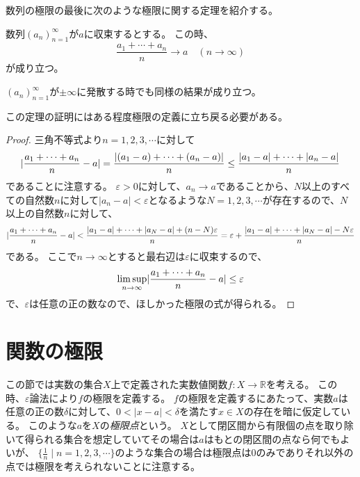 数列の極限の最後に次のような極限に関する定理を紹介する。

\begin{theorem}
\label{t_average_conv}
数列$(a_n)_{n = 1}^\infty$が$a$に収束するとする。
この時、
$$
\frac{a_1+\cdots+a_n}{n} \to a \quad (n \to \infty)
$$
が成り立つ。
\end{theorem}

\begin{remark}
$(a_n)_{n = 1}^\infty$が$\pm \infty$に発散する時でも同様の結果が成り立つ。
\end{remark}

この定理の証明にはある程度極限の定義に立ち戻る必要がある。

\begin{proof}
三角不等式より$n = 1, 2, 3, \cdots$に対して
$$
\lvert\frac{a_1+\cdots+a_n}{n}-a\rvert = \frac{|(a_1-a)+\cdots+(a_n-a)|}{n} \le \frac{|a_1-a|+\cdots+|a_n-a|}{n}
$$
であることに注意する。
$\varepsilon > 0$に対して、$a_n \to a$であることから、$N$以上のすべての自然数$n$に対して$|a_n-a| < \varepsilon$となるような$N = 1, 2, 3, \cdots$が存在するので、$N$以上の自然数$n$に対して、
$$
\lvert\frac{a_1+\cdots+a_n}{n}-a\rvert
< \frac{|a_1-a|+\cdots+|a_N-a|+(n-N)\varepsilon}{n}
= \varepsilon+\frac{|a_1-a|+\cdots+|a_N-a|-N\varepsilon}{n}
$$
である。
ここで$n \to \infty$とすると最右辺は$\varepsilon$に収束するので、
$$
\limsup_{n \to \infty}\lvert\frac{a_1+\cdots+a_n}{n}-a\rvert \le \varepsilon
$$
で、$\varepsilon$は任意の正の数なので、ほしかった極限の式が得られる。
\end{proof}

\section{関数の極限}

この節では実数の集合$X$上で定義された実数値関数$f: X \to \mathbb{R}$を考える。
この時、$\varepsilon$論法により$f$の極限を定義する。
$f$の極限を定義するにあたって、実数$a$は任意の正の数$\delta$に対して、$0 < |x-a| < \delta$を満たす$x \in X$の存在を暗に仮定している。
このような$a$を$X$の\emph{極限点}という。
$X$として閉区間から有限個の点を取り除いて得られる集合を想定していてその場合は$a$はもとの閉区間の点なら何でもよいが、
$\{ \frac{1}{n} \mid n = 1, 2, 3, \cdots \}$のような集合の場合は極限点は$0$のみでありそれ以外の点では極限を考えられないことに注意する。

